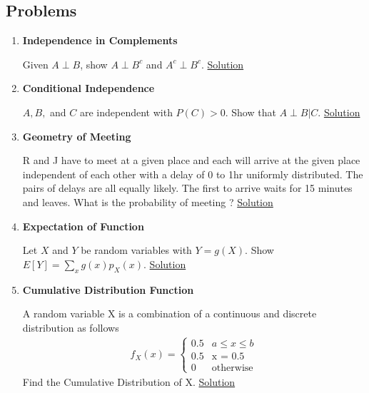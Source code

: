 \documentclass[../probability-notes.tex]{subfiles}
\begin{document}
    \subsection{Problems}
    \begin{enumerate}
    \item \hypertarget{q_indcomp}{\textbf{Independence in Complements}}\newline
    Given $A \perp B$, show $A \perp B^{c}$ and $A^{c} \perp B^{c}$. \hyperlink{a_indcomp}{Solution}

    \item \hypertarget{q_conind}{\textbf{Conditional Independence}}\newline
    $A,B,$ and $C$ are independent with $P(C) > 0$. Show that $A\perp B |C$. \hyperlink{a_conind}{Solution}

    \item \hypertarget{q_geomeet}{\textbf{Geometry of Meeting}}\newline
    R and J have to meet at a given place and each will arrive at the given place independent of each other with a delay of 0 to 1hr uniformly distributed. The pairs of delays are all equally likely. The first to arrive waits for 15 minutes and leaves. What is the probability of meeting ? \hyperlink{a_geomeet}{Solution}
    
    \item \hypertarget{q_expfn}{\textbf{Expectation of Function}}\newline
    Let $X$ and $Y$ be random variables with $Y = g(X)$. Show $E[Y] = \sum_{x}g(x)p_{X}(x)$. \hyperlink{a_expfn}{Solution}

    \item \hypertarget{q_cumuldistfn}{\textbf{Cumulative Distribution Function}}\newline
    A random variable X is a combination of a continuous and discrete distribution as follows
    \begin{align*}
        f_{X}(x) = \begin{cases} 0.5 &\mbox{$a \leq x \leq b$}\\
                                 0.5 &\mbox{x = 0.5}\\
                                 0 &\mbox{otherwise} \end{cases}
    \end{align*}
    Find the Cumulative Distribution of X. \hyperlink{a_cumuldistfn}{Solution}
    

\end{enumerate}
\end{document}
